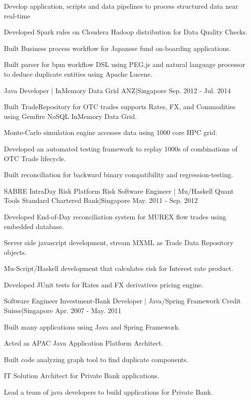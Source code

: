 \begin{cventries}
{\begin{cvitems}
        \item {Develop application, scripts and data pipelines to process structured data near real-time}
        \item {Developed Spark rules on Cloudera Hadoop distribution for Data Quality Checks.}
        \item {Built Business process workflow for Japanese fund on-boarding applications.}
        \item {Built parser for bpm workflow DSL using PEG.js and natural language processor to deduce duplicate entities using Apache Lucene.}
      \end{cvitems}
    }
    {Java Developer | InMemory Data Grid}
    {ANZ|Singapore}
    {Sep. 2012 - Jul. 2014}
    {
      \begin{cvitems}
        \item {Built TradeRepository for OTC trades  supports Rates, FX, and Commodities using Gemfire NoSQL InMemory Data Grid.}
        \item {Monte-Carlo simulation engine accesses data using 1000 core HPC grid.}
        \item {Developed an automated testing framework to replay 1000s of combinations of OTC Trade lifecycle.}
        \item {Built reconciliation for backward binary compatibility and regression-testing.}
      \end{cvitems}
    }
  \cventry
    {SABRE IntraDay Risk Platform}
    {Risk Software Engineer | Mu/Haskell Quant Tools}
    {Standard Chartered Bank|Singapore}
    {May. 2011 - Sep. 2012}
    {
      \begin{cvitems}
        \item {Developed End-of-Day reconciliation system for MUREX flow trades using embedded database.}
        \item {Server side javascript development, stream MXML as Trade Data Repository objects.}
        \item {Mu-Script/Haskell development that calculates risk for Interest rate product.}
        \item {Developed JUnit tests for Rates and FX derivatives pricing engine.}
      \end{cvitems}
    }
  \cventry
    {Software Engineer}
    {Investment-Bank Developer | Java/Spring Framework}
    {Credit Suisse|Singapore}
    {Apr. 2007 - May. 2011}
    {
      \begin{cvitems}
        \item {Built many applications using Java and Spring Framework.}
        \item {Acted as APAC Java Application Platform Architect.}
        \item {Built code analyzing graph tool to find duplicate components.}
        \item {IT Solution Architect for Private Bank applications.}
        \item {Lead a team of java developers to build applications for Private Bank.}
      \end{cvitems}
    }
\end{cventries}
